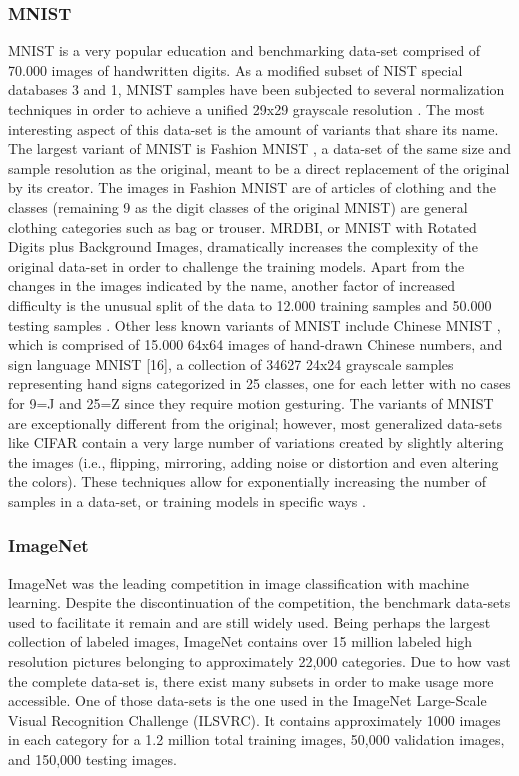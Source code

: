 \documentclass[10pt,twocolumn,letterpaper]{article}
\begin{document}
\subsubsection{MNIST}
MNIST is a very popular education and benchmarking data-set comprised of 70.000 images of handwritten digits. As a modified subset of NIST special databases 3 and 1, MNIST samples have been subjected to several normalization techniques in order to achieve a unified 29x29 grayscale resolution \cite{noauthor_papers_nodate}. The most interesting aspect of this data-set is the amount of variants that share its name. The largest variant of MNIST is Fashion MNIST \cite{noauthor_fashion_nodate}, a data-set of the same size and sample resolution as the original, meant to be a direct replacement of the original by its creator. The images in Fashion MNIST are of articles of clothing and the classes (remaining 9 as the digit classes of the original MNIST) are general clothing categories such as bag or trouser. MRDBI, or MNIST with Rotated Digits plus Background Images, dramatically increases the complexity of the original data-set in order to challenge the training models. Apart from the changes in the images indicated by the name, another factor of increased difficulty is the unusual split of the data to 12.000 training samples and 50.000 testing samples \cite{iba_deep_2020}.  Other less known variants of MNIST include Chinese MNIST \cite{noauthor_chinese_nodate}, which is comprised of 15.000 64x64 images of hand-drawn Chinese numbers, and sign language MNIST [16], a collection of 34627 24x24 grayscale samples representing hand signs categorized in 25 classes, one for each letter with no cases for 9=J and 25=Z since they require motion gesturing. 
The variants of MNIST are exceptionally different from the original; however, most generalized data-sets like CIFAR contain a very large number of variations created by slightly altering the images (i.e., flipping, mirroring, adding noise or distortion and even altering the colors). These techniques allow for exponentially increasing the number of samples in a data-set, or training models in specific ways \cite{he_deep_2015} \cite{zeiler_visualizing_2013}.

\subsubsection{ImageNet}
ImageNet \cite{krizhevsky_imagenet_2012} was the leading competition in image classification with machine learning. Despite the discontinuation of the competition, the benchmark data-sets used to facilitate it remain and are still widely used. Being perhaps the largest collection of labeled images, ImageNet contains over 15 million labeled high resolution pictures belonging to approximately 22,000 categories. Due to how vast the complete data-set is, there exist many subsets in order to make usage more accessible. One of those data-sets is the one used in the ImageNet Large-Scale Visual Recognition Challenge (ILSVRC). It contains approximately 1000 images in each category for a 1.2 million total training images, 50,000 validation images, and 150,000 testing images.
\end{document}
